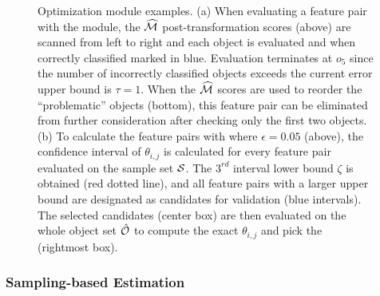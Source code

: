 \begin{figure}[t!]
 \centering
 \vspace{-2mm}
 \vspace{-5mm}
\caption{Optimization module examples. (a) When evaluating a feature pair with the \earlyT module, the $\widehat{{\mathcal{M}}}$ post-transformation scores (above) are scanned from left to right and each object is evaluated  and when correctly classified marked in blue. Evaluation terminates at $o_5$ since the number of incorrectly classified objects exceeds the current error upper bound is $\tau=1$. When the $\widehat{{\mathcal{M}}}$ scores are used to reorder the ``problematic'' objects (bottom), this feature pair can be eliminated from further consideration after checking only the first two objects. (b) To calculate the \topthree feature pairs with \sampling where $\epsilon = 0.05$ (above), the confidence interval of $\theta_{i,j}$ is calculated for every feature pair evaluated on the sample set ${\mathcal{S}}$. The $3^{rd}$ interval lower bound $\zeta$ is obtained (red dotted line), and all feature pairs with a larger upper bound are designated as candidates for validation (blue intervals). The selected candidates (center box) are then evaluated on the whole object set $\hat{{\mathcal{O}}}$ to compute the exact $\theta_{i,j}$ and pick the \topthree (rightmost box).}
\vspace{-5mm}
\label{fig:etermANDsampling}
\end{figure}

\subsubsection{Sampling-based Estimation} \label{ssec:sampling}

